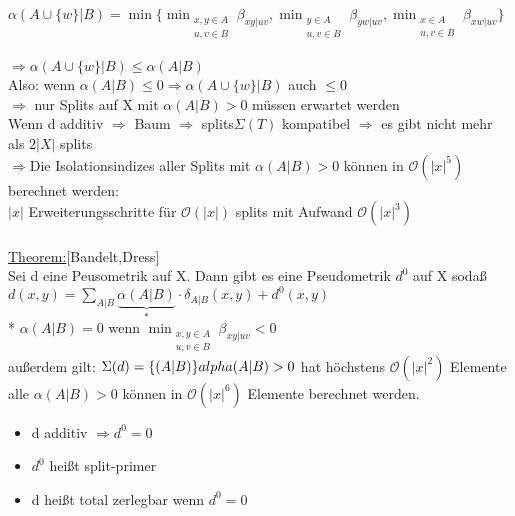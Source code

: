 \documentclass[12pt,a4paper]{article}
\begin{document}
$\alpha(A\cup\{w\}|B)=\min \{ \displaystyle\min_{\substack{x,y \in A \\ u,v \in B}} \beta_{xy|uv}, \displaystyle\min_{\substack{y \in A \\ u,v \in B}} \beta_{yw|uv}, \displaystyle\min_{\substack{x \in A \\ u,v \in B}} \beta_{xw|uv} \}$
\\\\
$\Rightarrow \alpha(A \cup \{w\}|B) \leq \alpha(A|B)$\\
Also: wenn $\alpha(A|B) \leq 0 \Rightarrow \alpha(A \cup \{w\}|B)$ auch $\leq0$\\ 
$\Rightarrow$ nur Splits auf X mit $\alpha(A|B)>0$ müssen erwartet werden\\
Wenn d additiv $\Rightarrow$ Baum $\Rightarrow$ splits$\Sigma(T)$ kompatibel $\Rightarrow$ es gibt nicht mehr als $2|X|$ splits\\
$\Rightarrow$Die Isolationsindizes aller Splits mit $\alpha(A|B)>0$ können in $\mathcal{O}(|x|^5)$ berechnet werden:\\
$|x|$ Erweiterungsschritte für $\mathcal{O}(|x|)$ splits mit Aufwand $\mathcal{O}(|x|^3)$\\\\
\underline{Theorem:}[Bandelt,Dress]\\
Sei d eine Peusometrik auf X. Dann gibt es eine Pseudometrik $d^0$ auf X sodaß\\
$d(x,y)=\displaystyle \sum_{A|B}\underbrace{\alpha(A|B)}_{*} \cdot \delta_{A|B}(x,y) + d^0(x,y)$\\
* $\alpha(A|B)=0$ wenn $\displaystyle\min_{\substack{x,y \in A \\ u,v \in B}}\beta_{xy|uv}<0$\\
außerdem gilt:
$\Sigma(d)=\{(A|B)\}\\alpha(A|B)>0$ hat höchstens $\mathcal{O}(|x|^2)$ Elemente\\
alle $\alpha(A|B)>0$ können in $\mathcal{O}(|x|^6)$ Elemente berechnet werden.\\
\begin{itemize}
	\item d additiv $\Rightarrow d^0=0$
	\item $d^0$ heißt split-primer
	\item d heißt total zerlegbar wenn $d^0=0$
\end{itemize}
\end{document}
